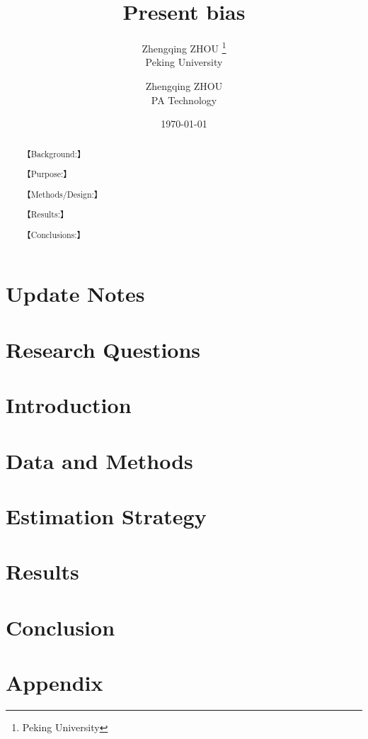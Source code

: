 \documentclass[lang=en, 12pt, a4paper, cite=super, chinesefont=Mac-default]{elegantpaper}
\title{Present bias }
\author{Zhengqing ZHOU \thanks{Peking University} \\ Peking University \and Zhengqing ZHOU \\ PA Technology}
\institute{\href{https://pe.pku.edu.cn/}{Department of Physical Education}}
\date{\today}
\begin{document}
{\selectfont
\clearpage
\maketitle
\thispagestyle{empty}

\begin{abstract}
{\selectfont
 \par
【Background:】
\par
【Purpose:】
\par
【Methods/Design:】 
\par
【Results:】 
\par
【Conclusions:】
\par
{}
}
\end{abstract}

	\newpage
    \tableofcontents
    \setcounter{page}{1}
	\newpage

	\newpage
    \section*{Update Notes} 
    \label{Update Notes}
    
	\newpage
	\section{Research Questions} 
	\label{Research Questions}
	
	\newpage
	\section{Introduction} 
	\label{Introduction}
	
    \newpage
    \section{Data and Methods} 
    \label{Data and Methods}
    
    \newpage
    \section{Estimation Strategy}
    \label{Estimation Strategy}
    
    \newpage
    \section{Results}
    \label{Results}
    
	\newpage
	\section{Conclusion} 
	\label{Conclusion}
	
	\newpage
	\appendix
	\section{Appendix}
	\label{Appendix}
	
	
	\newpage
    \printbibliography[heading=bibintoc, title=\ebibname]
    \appendix
    \addappheadtotoc

}
\end{document}
